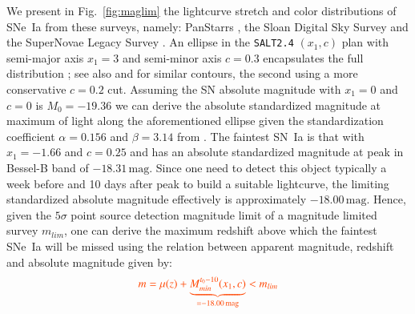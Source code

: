 \documentclass[]{aa} %
\newcommand{\nn}[1]{{\textcolor[rgb]{1, 0.27, 0}{#1}}}
\begin{document}
We present in Fig.~\ref{fig:maglim} the lightcurve stretch and color
distributions of SNe~Ia from these surveys, namely: PanStarrs
\citep[PS1][]{rest2014}, the Sloan Digital Sky Survey
\citep[SDSS][]{frieman2008} and the SuperNovae Legacy Survey
\citep[SNLS][]{astier2006}. An ellipse in the \textsc{\texttt{SALT2.4}} $(x_1,
c)$ plan with semi-major axis $x_1=3$ and semi-minor axis $c=0.3$ encapsulates
the full distribution \citep{guy2007,betoule2014}; see also \citet{bazin2011}
and \citet{campbell2013} for similar contours, the second using a more
conservative $c=0.2$ cut. Assuming the SN absolute magnitude with $x_1=0$ and
$c=0$ is $M_0=-19.36$ \citep{kessler2009,scolnic2014} we can derive the absolute
standardized magnitude at maximum of light along the aforementioned ellipse
given the standardization coefficient $\alpha=0.156$ and $\beta=3.14$ from
\cite{scolnic2018a}. The faintest SN~Ia is that with $x_1=-1.66$ and $c=0.25$
and has an absolute standardized magnitude at peak in Bessel-B band of
$-18.31\,\mathrm{mag}$. Since one need to detect this object typically a week
before and 10 days after peak to build a suitable lightcurve, the limiting
\nn{standardized} absolute magnitude effectively is approximately
$-18.00\,\mathrm{mag}$. Hence, given the $5\sigma$ point source detection
magnitude limit of a magnitude limited survey $m_{lim}$, one can derive the
maximum redshift above which the faintest SNe~Ia will be missed \nn{using the
relation between apparent magnitude, redshift and absolute magnitude given by:}
\begin{equation}\label{eq:m_lim}
    \nn{m = \mu(z) + \underbrace{M_{min}^{t_0-10}(x_1, c)}_{=-18.00\,\text{mag}}
    < m_{lim}}
\end{equation}
\end{document}
